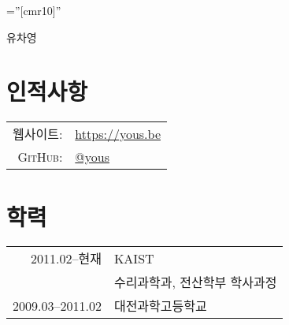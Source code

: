 \documentclass[a4paper,10pt]{article}
\begin{document}

\pagestyle{empty} %

\font\fb=''[cmr10]'' %

\par{\centering
  {\Huge 유차영
}\bigskip\par}

\section{인적사항}

\begin{tabular}{rl}
  \textsc{웹사이트:} & \url{https://yous.be} \\
  \textsc{GitHub:}   & \href{https://github.com/yous}{@yous} \\
\end{tabular}

\section{학력}
\begin{tabular}{rl}
  2011.02--현재 & KAIST \\
                  & \textsc{수리과학과}, \textsc{전산학부} 학사과정 \\
  2009.03--2011.02 & 대전과학고등학교
\end{tabular}

\end{document}
